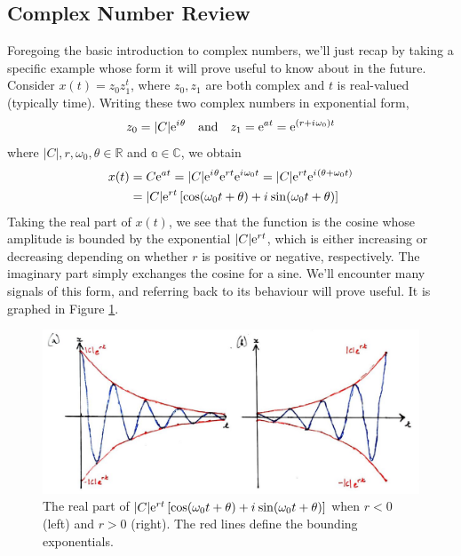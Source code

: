 \subsection{Complex Number Review}
%
Foregoing the basic introduction to complex numbers, we'll just recap by taking a specific
example whose form it will prove useful to know about in the future. Consider
$x(t) = z_0z_1^t$, where $z_0,z_1$ are both complex and $t$ is real-valued (typically time).
Writing these two complex numbers in exponential form,
%
\begin{displaymath}
  z_0 = |C|\mathrm{e}^{{i\mkern1mu}\theta} \quad\mathrm{and}\quad z_1 = \mathrm{e}^{at} = \mathrm{e}^{(r + {i\mkern1mu}\omega_0)t}
\end{displaymath}
%
where $|C|,r,\omega_0,\theta\in\mathbb{R}$ and $\mathbb{a}\in\mathbb{C}$, we obtain
%
\begin{align*}
  x(t) &= C\mathrm{e}^{at} = |C|\mathrm{e}^{{i\mkern1mu}\theta}\mathrm{e}^{rt}\mathrm{e}^{{i\mkern1mu}\omega_0 t} = |C|\mathrm{e}^{rt}\mathrm{e}^{{i\mkern1mu}(\theta + \omega_0 t)} \\
  &= |C|\mathrm{e}^{rt}\left[ \cos(\omega_0 t + \theta) + {i\mkern1mu}\sin(\omega_0 t + \theta) \right]
\end{align*}
%
Taking the real part of $x(t)$, we see that the function is the cosine whose amplitude is
bounded by the exponential $|C|\mathrm{e}^{rt}$, which is either increasing or decreasing depending
on whether $r$ is positive or negative, respectively. The imaginary part simply exchanges
the cosine for a sine. We'll encounter many signals of this form, and referring back to its
behaviour will prove useful. It is graphed in Figure \ref{fig::lecture_1_complex_numbers}.\\
%
\begin{figure}[H]
  \includegraphics[width=\textwidth]{images/lecture_1_complex_numbers.JPG}
  \caption{
    The real part of
    $|C|\mathrm{e}^{rt}\left[ \cos(\omega_0 t + \theta) + {i\mkern1mu}\sin(\omega_0 t + \theta) \right]$
    when $r < 0$ (left) and $r > 0$ (right). The red lines define the bounding exponentials.
  }
  \label{fig::lecture_1_complex_numbers}
\end{figure}

